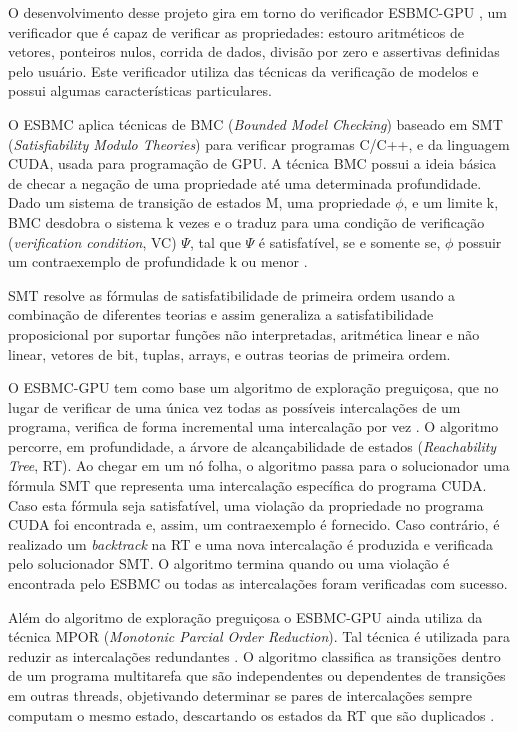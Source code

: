 O desenvolvimento desse projeto gira em torno do verificador ESBMC-GPU \cite{monteiro2018}, um verificador que é capaz de verificar as propriedades: estouro aritméticos de vetores, ponteiros nulos, corrida de dados, divisão por zero e assertivas definidas pelo usuário. Este verificador utiliza das técnicas da verificação de modelos e possui algumas características particulares.  


O ESBMC aplica técnicas de BMC (\textit{Bounded Model Checking}) baseado em SMT (\textit{Satisfiability Modulo Theories}) para verificar programas C/C++, e da linguagem CUDA, usada para programação de GPU. A técnica BMC possui a ideia básica de checar a negação de uma propriedade até uma determinada profundidade. Dado um sistema de transição de estados M, uma propriedade $\phi$, e um limite k, BMC desdobra o sistema k vezes e o traduz para uma condição de verificação (\textit{verification condition}, VC) $\Psi$, tal que $\Psi$ é satisfatível, se e somente se, $\phi$ possuir um contraexemplo de profundidade k ou menor \cite{cordeiro2012}.


SMT resolve as fórmulas de satisfatibilidade de primeira ordem usando a combinação de diferentes teorias e assim generaliza a satisfatibilidade proposicional por suportar funções não interpretadas, aritmética linear e não linear, vetores de bit, tuplas, arrays, e outras teorias de primeira ordem.


O ESBMC-GPU tem como base um algoritmo de exploração preguiçosa, que no lugar de verificar de uma única vez todas as possíveis intercalações de um programa, verifica de forma incremental uma intercalação por vez \cite{cordeiro2011}. O algoritmo percorre, em profundidade, a árvore de alcançabilidade de estados (\textit{Reachability Tree}, RT). Ao chegar em um nó folha, o algoritmo passa para o solucionador uma fórmula SMT que representa uma intercalação específica do programa CUDA. Caso esta fórmula seja satisfatível, uma violação da propriedade no programa CUDA foi encontrada e, assim, um contraexemplo é fornecido. Caso contrário, é realizado um \textit{backtrack} na RT e uma nova intercalação é produzida e verificada pelo solucionador SMT. O algoritmo termina quando ou uma violação é encontrada pelo ESBMC ou todas as intercalações foram verificadas com sucesso.


Além do algoritmo de exploração preguiçosa o ESBMC-GPU ainda utiliza da técnica MPOR (\textit{Monotonic Parcial Order Reduction}). Tal técnica é utilizada para reduzir as intercalações redundantes \cite{kahlon2009}. O algoritmo classifica as transições dentro de um programa multitarefa que são independentes ou dependentes de transições em outras threads, objetivando determinar se pares de intercalações sempre computam o mesmo estado, descartando os estados da RT que são duplicados \cite{morse2015}.


